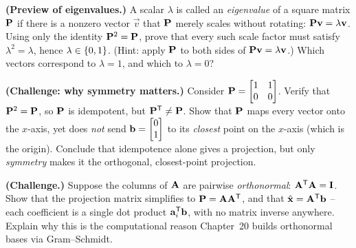 \begin{exercise}\label{ch18:ex-eigen}
\textbf{(Preview of eigenvalues.)} A scalar $\lambda$ is called an \emph{eigenvalue} of a square
matrix $\mathbf{P}$ if there is a nonzero vector $\vec{v}$ that $\mathbf{P}$ merely scales without rotating:
$\mathbf{P}\mathbf{v} = \lambda\mathbf{v}$. Using only the identity $\mathbf{P}^2=\mathbf{P}$, prove that every
such scale factor must satisfy $\lambda^2=\lambda$, hence $\lambda\in\{0,1\}$. (Hint: apply $\mathbf{P}$
to both sides of $\mathbf{P}\mathbf{v}=\lambda\mathbf{v}$.) Which vectors correspond to $\lambda=1$, and which
to $\lambda=0$?
\end{exercise}

\begin{exercise}\label{ch18:ex-oblique}
\textbf{(Challenge: why symmetry matters.)} Consider $\mathbf{P}=\begin{bmatrix}1 & 1\\ 0 & 0\end{bmatrix}$.
Verify that $\mathbf{P}^2=\mathbf{P}$, so $\mathbf{P}$ is idempotent, but $\mathbf{P}^{\mathsf{T}}\neq\mathbf{P}$. Show that
$\mathbf{P}$ maps every vector onto the $x$-axis, yet does \emph{not} send $\mathbf{b}=\begin{bmatrix}0\\1\end{bmatrix}$ to
its \emph{closest} point on the $x$-axis (which is the origin). Conclude that idempotence alone
gives a projection, but only \emph{symmetry} makes it the orthogonal, closest-point projection.
\end{exercise}

\begin{exercise}\label{ch18:ex-orthonormal}
\textbf{(Challenge.)} Suppose the columns of $\mathbf{A}$ are pairwise \emph{orthonormal}:
$\mathbf{A}^{\mathsf{T}}\mathbf{A}=\mathbf{I}$. Show that the projection matrix simplifies to
$\mathbf{P}=\mathbf{A}\mathbf{A}^{\mathsf{T}}$, and that $\hat{\mathbf{x}}=\mathbf{A}^{\mathsf{T}}\mathbf{b}$ -- each coefficient is a
single dot product $\mathbf{a}_i^{\mathsf{T}}\mathbf{b}$, with no matrix inverse anywhere. Explain why this is the
computational reason Chapter~20 builds orthonormal bases via
Gram--Schmidt.
\end{exercise}

